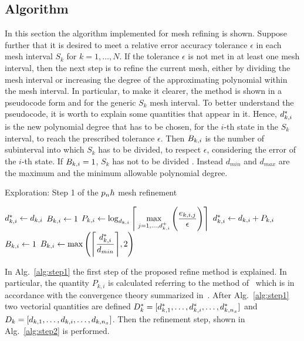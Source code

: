 \subsection*{Algorithm}
In this section the algorithm implemented for mesh refining is shown.
Suppose further that it is desired to meet a relative error accuracy tolerance $\epsilon$ in each mesh
interval $S_k$ for $k = 1, \dots, N$. If the tolerance  $\epsilon$  is not met in at least one mesh interval, then the next step is to refine the current mesh, either by dividing the mesh interval or increasing the degree of the approximating polynomial within the mesh interval.
In particular, to make it clearer, the method is shown in a pseudocode form and for the generic $S_k$ mesh interval.
To better understand the pseudocode, it is worth to explain some quantities that appear in it.
Hence, $d_{k,i}^{*}$ is the new polynomial degree that has to be chosen, for the $i$-th state in the $S_k$ interval, to reach the prescribed tolerance $\epsilon$. Then $B_{k,i}$ is the number of subinterval into which $S_k$ has to be divided, to respect $\epsilon$, considering the error of the $i$-th state. If $B_{k,i} = 1$, $S_k$ has not to be divided . Instead $d_{min}$ and $d_{max}$ are the maximum and the minimum allowable polynomial degree.




\begin{algorithm}
\caption{Exploration: Step 1 of the $p_{n}h$ mesh refinement}\label{alg:step1}
	\begin{algorithmic}[1]
				\State $d_{k,i}^{*} \gets d_{k,i}$
				\State $B_{k,i} \gets 1$  %
			\Else
				\State $P_{k,i} \gets \log_{d_{k,i}} \Bigg\lceil \max\limits_{j= 1, \dots, d_{k,i}^{+}} \Bigg(\dfrac{e_{k,i,j}}{\epsilon}\Bigg) \Bigg\rceil$
				\State $d_{k,i}^{*} \gets d_{k,i} + P_{k,i}$
						\State $B_{k,i} \gets 1$		
					\Else
						\State $B_{k,i} \gets \max\Bigg(\Bigg\lceil \dfrac{d_{k,i}^{*}}{d_{min}}\Bigg\rceil, 2\Bigg)$
					\EndIf
			\EndIf
		\EndFor
	\end{algorithmic}
\end{algorithm}

In Alg.~\ref{alg:step1} the first step of the proposed refine method is explained. In particular, the quantity $P_{k,i}$ is calculated referring to the method of~\cite{Patterson:OCAM:2015} which is in accordance with the convergence theory summarized in~\cite{Hou:GNC:2012,Hou:PHD:2013}.  After Alg.~\ref{alg:step1} two vectorial quantities are defined $D_{k}^{*} = [d_{k,1}^{*}, \dots, d_{k,i}^{*}, \dots, d_{k,n_x}^{*}]$ and $D_{k} = [d_{k,1}, \dots, d_{k,i}, \dots, d_{k,n_x}]$. Then the refinement step, shown in Alg.~\ref{alg:step2} is performed.

